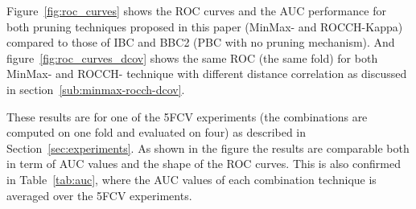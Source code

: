 \begin{table}[b]
    \small
    \centering
    \renewcommand{\arraystretch}{1.3}
    \caption{Comparison of pruning and combination time (seconds) and number of Boolean operations required to achieve the final ROCCH during the design phase, and the number of selected detectors during the operational phase. All values are averaged over 5FCV.}
    \label{tab:time-complexity}
    \centering
\end{table}


Figure~\ref{fig:roc_curves} shows the ROC curves and the AUC performance for both pruning techniques proposed in this paper (MinMax- and ROCCH-Kappa) compared to those of IBC and BBC2 (PBC with no pruning mechanism). And figure~\ref{fig:roc_curves_dcov} shows the same ROC (the same fold) for both MinMax- and ROCCH- technique with different distance correlation as discussed in section~\ref{sub:minmax-rocch-dcov}.

These results are for one of the 5FCV experiments (the combinations are computed on one fold and evaluated on four) as described in Section~\ref{sec:experiments}.
As shown in the figure the results are comparable both in term of AUC values and the shape of the ROC curves.
This is also confirmed in Table~\ref{tab:auc}, where the AUC values of each combination technique is averaged over the 5FCV experiments.

